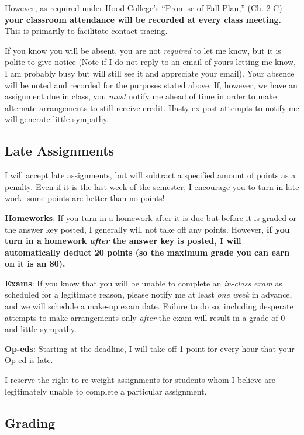 \documentclass{article}
\begin{document}
However, as required under Hood College's ``Promise of Fall Plan,'' (Ch.
2-C) \textbf{your classroom attendance will be recorded at every class
meeting.} This is primarily to facilitate contact tracing.

If you know you will be absent, you are not \emph{required} to let me
know, but it is polite to give notice (Note if I do not reply to an
email of yours letting me know, I am probably busy but will still see it
and appreciate your email). Your absence will be noted and recorded for
the purposes stated above. If, however, we have an assignment due in
class, you \emph{must} notify me ahead of time in order to make
alternate arrangements to still receive credit. Hasty ex-post attempts
to notify me will generate little sympathy.

\hypertarget{late-assignments}{%
\subsection{Late Assignments}\label{late-assignments}}

I will accept late assignments, but will subtract a specified amount of
points as a penalty. Even if it is the last week of the semester, I
encourage you to turn in late work: some points are better than no
points!

\textbf{Homeworks}: If you turn in a homework after it is due but before
it is graded or the answer key posted, I generally will not take off any
points. However, \textbf{if you turn in a homework \emph{after} the
answer key is posted, I will automatically deduct 20 points (so the
maximum grade you can earn on it is an 80).}

\textbf{Exams}: If you know that you will be unable to complete an
\emph{in-class exam} as scheduled for a legitimate reason, please notify
me at least \emph{one week} in advance, and we will schedule a make-up
exam date. Failure to do so, including desperate attempts to make
arrangements only \emph{after} the exam will result in a grade of 0 and
little sympathy.

\textbf{Op-eds}: Starting at the deadline, I will take off 1 point for
every hour that your Op-ed is late.

I reserve the right to re-weight assignments for students whom I believe
are legitimately unable to complete a particular assignment.

\hypertarget{grading}{%
\subsection{Grading}\label{grading}}
\end{document}
